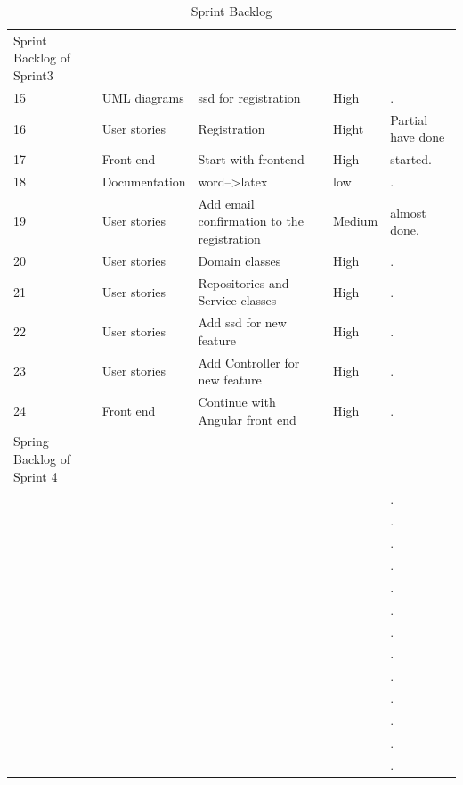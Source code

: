 \documentclass{scrartcl}
\begin{document}
\begin{table}[h]
\begin{center}
\begin{tabular}{| p{2.5cm}| p{4cm} | p{5cm} |p{2.5cm} | p{4cm}|}
                  Sprint Backlog of Sprint3 \\
                    15 & UML diagrams & ssd for registration  & High & . \\ \hline
                      16 & User stories & Registration & Hight & Partial have done \\ \hline
                       17 & Front end & Start with frontend & High &   started. \\ \hline
                        18 & Documentation & word-->latex & low & . \\ \hline
                         19 & User stories & Add email confirmation to the registration & Medium & almost done. \\ \hline
                          20 & User stories & Domain classes & High & . \\ \hline
                           21 & User stories & Repositories and Service classes & High & . \\ \hline
                            22 & User stories & Add ssd for new feature  & High & . \\ \hline
                            23 & User stories &  Add Controller for new feature & High & . \\ \hline
          24 & Front end  & Continue with Angular front end  & High & . \\ \hline
	
	Spring Backlog of Sprint 4\\
	  &  &  &  & . \\ \hline
	    &  &  &  & . \\ \hline
	     &  &  &  & . \\ \hline
	      &  &  &  & . \\ \hline
	       &  &  &  & . \\ \hline
	        &  &  &  & . \\ \hline
	         &  &  &  & . \\ \hline
	         &  &  &  & . \\ \hline
	           &  &  &  & . \\ \hline
	            &  &  &  & . \\ \hline
	             &  &  &  & . \\ \hline
	              &  &  &  & . \\ \hline
	               &  &  &  & . \\ \hline
	
	 
        
    \end{tabular}
    \end{center}
    \caption{Sprint Backlog}
    \label{tab:typo}
\end{table}
\end{document}
